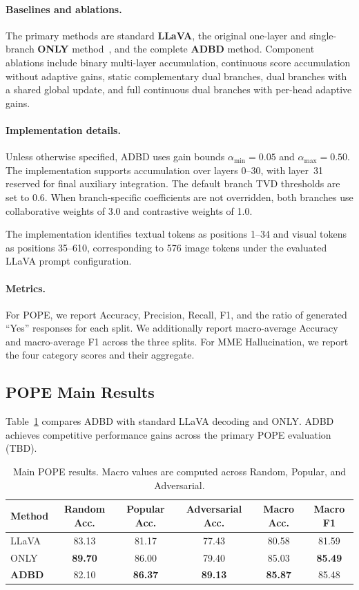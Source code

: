 \paragraph{Baselines and ablations.}
The primary methods are standard \textbf{LLaVA}, the original one-layer and single-branch \textbf{ONLY} method~\cite{wan2025only}, and the complete \textbf{ADBD} method. Component ablations include binary multi-layer accumulation, continuous score accumulation without adaptive gains, static complementary dual branches, dual branches with a shared global update, and full continuous dual branches with per-head adaptive gains.

\paragraph{Implementation details.}
Unless otherwise specified, ADBD uses gain bounds $\alpha_{\min}=0.05$ and $\alpha_{\max}=0.50$. The implementation supports accumulation over layers 0--30, with layer~31 reserved for final auxiliary integration. The default branch TVD thresholds are set to 0.6. When branch-specific coefficients are not overridden, both branches use collaborative weights of 3.0 and contrastive weights of 1.0.

The implementation identifies textual tokens as positions 1--34 and visual tokens as positions 35--610, corresponding to 576 image tokens under the evaluated LLaVA prompt configuration.

\paragraph{Metrics.}
For POPE, we report Accuracy, Precision, Recall, F1, and the ratio of generated ``Yes'' responses for each split. We additionally report macro-average Accuracy and macro-average F1 across the three splits. For MME Hallucination, we report the four category scores and their aggregate.

\subsection{POPE Main Results}

Table~\ref{tab:main_results} compares ADBD with standard LLaVA decoding and ONLY. ADBD achieves competitive performance gains across the primary POPE evaluation (TBD).

\begin{table}[t]
\centering
\small
\setlength{\tabcolsep}{5pt}
\begin{tabular}{lccccc}
\toprule
Method & Random Acc. & Popular Acc. & Adversarial Acc. & Macro Acc. & Macro F1 \\
\midrule
LLaVA & 83.13 & 81.17 & 77.43 & 80.58 & 81.59 \\
ONLY  & \textbf{89.70} & 86.00 & 79.40 & 85.03 & \textbf{85.49} \\
\textbf{ADBD} & 82.10 & \textbf{86.37} & \textbf{89.13} & \textbf{85.87} & 85.48 \\
\bottomrule
\end{tabular}
\caption{Main POPE results. Macro values are computed across Random, Popular, and Adversarial.}
\label{tab:main_results}
\end{table}


